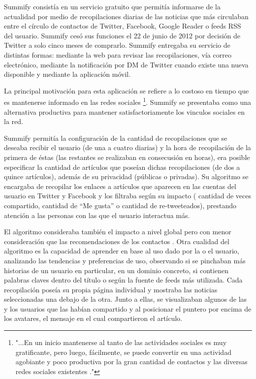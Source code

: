 Summify\cite{summify} consistía en un servicio gratuito que permitía informarse de la actualidad por medio de recopilaciones diarias de las noticias que más circulaban entre el círculo de contactos de Twitter, Facebook, Google Reader o feeds RSS del usuario. Summify cesó sus funciones el 22 de junio de 2012 por decisión de Twitter a solo cinco meses de comprarlo. Summify entregaba su servicio de distintas formas: mediante la web para revisar las recopilaciones, vía correo electrónico, mediante la notificación por DM de Twitter cuando existe una nueva disponible y mediante la aplicación móvil.

La principal motivación para esta aplicación se refiere a lo costoso en tiempo que es mantenerse informado en las redes sociales \footnote{"...En un inicio mantenerse al tanto de las actividades sociales es muy gratificante, pero luego, fácilmente, se puede convertir en una actividad agobiante y poco productiva por la gran cantidad de contactos y las diversas redes sociales existentes \cite{summifyvideo}."}. Summify se presentaba como una alternativa productiva para mantener satisfactoriamente los vinculos sociales en la red.

Summify permitía la configuración de la cantidad de recopilaciones que se deseaba recibir el usuario (de una a cuatro diarias) y la hora de recopilación de la primera de éstas (las restantes se realizaban en consecusión en horas), era posible especificar la cantidad de artículos que poseían dichas recopilaciones (de dos a quince artículos), además de su privacidad (públicas o privadas). Su algoritmo se encargaba de recopilar los enlaces a artículos que aparecen en las cuentas del usuario en Twitter y Facebook y los filtraba según su impacto ( cantidad de veces compartido, cantidad de “Me gusta” o cantidad de re-tweeteados), prestando atención a las personas con las que el usuario interactua más. 

El algoritmo consideraba también el impacto a nivel global pero con menor consideración que las recomendaciones de los contactos \cite{summifyblog}. Otra cualidad del algoritmo es la capacidad de aprender en base al uso dado por la o el usuario, analizando las tendencias y preferencias de uso, observando si se pinchaban más historias de un usuario en particular, en un dominio concreto, si contienen palabras claves dentro del título o según la fuente de feeds más utilizada. Cada recopilación poseía su propia página individual y mostraba las noticias seleccionadas una debajo de la otra. Junto a ellas, se visualizaban algunos de las y los usuarios que las habían compartido y al posicionar el puntero por encima de los avatares, el mensaje en el cual compartieron el artículo.

